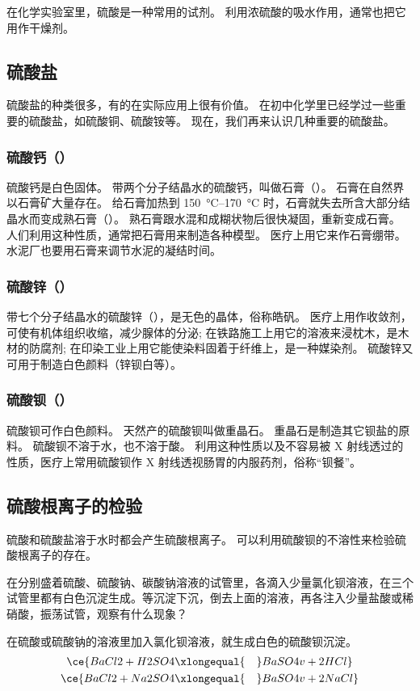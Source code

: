 在化学实验室里，硫酸是一种常用的试剂。
利用浓硫酸的吸水作用，通常也把它用作干燥剂。


\subsection{硫酸盐}
硫酸盐的种类很多，有的在实际应用上很有价值。
在初中化学里已经学过一些重要的硫酸盐，如硫酸铜、硫酸铵等。
现在，我们再来认识几种重要的硫酸盐。

\subsubsection{硫酸钙（）}
硫酸钙是白色固体。
带两个分子结晶水的硫酸钙，叫做石膏（）。
石膏在自然界以石膏矿大量存在。
给石膏加热到 \qtyrange{150}{170}{\celsius} 时，石膏就失去所含大部分结晶水而变成熟石膏（）。
熟石膏跟水混和成糊状物后很快凝固，重新变成石膏。
人们利用这种性质，通常把石膏用来制造各种模型。
医疗上用它来作石膏绷带。
水泥厂也要用石膏来调节水泥的凝结时间。

\subsubsection{硫酸锌（）}
带七个分子结晶水的硫酸锌（），是无色的晶体，俗称皓矾。
医疗上用作收敛剂，可使有机体组织收缩，减少腺体的分泌; 在铁路施工上用它的溶液来浸枕木，是木材的防腐剂; 在印染工业上用它能使染料固着于纤维上，是一种媒染剂。
硫酸锌又可用于制造白色颜料（锌钡白等）。

\subsubsection{硫酸钡（）}
硫酸钡可作白色颜料。
天然产的硫酸钡叫做重晶石。
重晶石是制造其它钡盐的原料。
硫酸钡不溶于水，也不溶于酸。
利用这种性质以及不容易被 X 射线透过的性质，医疗上常用硫酸钡作 X 射线透视肠胃的内服药剂，俗称“钡餐”。

\subsection{硫酸根离子的检验}
硫酸和硫酸盐溶于水时都会产生硫酸根离子。
可以利用硫酸钡的不溶性来检验硫酸根离子的存在。
\begin{Experiment}
在分别盛着硫酸、硫酸钠、碳酸钠溶液的试管里，各滴入少量氯化钡溶液，在三个试管里都有白色沉淀生成。等沉淀下沉，倒去上面的溶液，再各注入少量盐酸或稀硝酸，振荡试管，观察有什么现象？
\end{Experiment}
在硫酸或硫酸钠的溶液里加入氯化钡溶液，就生成白色的硫酸钡沉淀。
\begin{gather*}
  \ce{ BaCl2 +  H2SO4 \xlongequal{\quad} BaSO4 v + 2HCl }\\
  \ce{ BaCl2 + Na2SO4 \xlongequal{\quad} BaSO4 v + 2NaCl }
\end{gather*}

